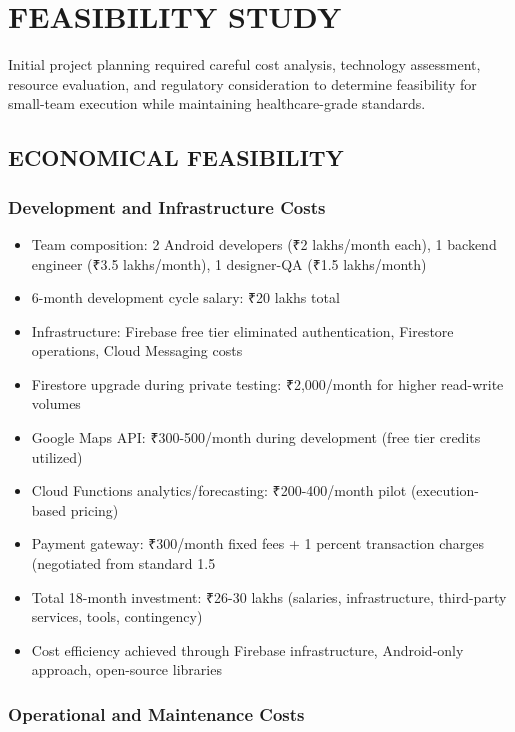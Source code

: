 \documentclass[12pt,a4paper]{report}
\begin{document}
\setcounter{chapter}{1}

\chapter{FEASIBILITY STUDY}

Initial project planning required careful cost analysis, technology assessment, resource evaluation, and regulatory consideration to determine feasibility for small-team execution while maintaining healthcare-grade standards.

\section{ECONOMICAL FEASIBILITY}

\subsection{Development and Infrastructure Costs}

\begin{itemize}
  \item Team composition: 2 Android developers (₹2 lakhs/month each), 1 backend engineer (₹3.5 lakhs/month), 1 designer-QA (₹1.5 lakhs/month)
  \item 6-month development cycle salary: ₹20 lakhs total
  \item Infrastructure: Firebase free tier eliminated authentication, Firestore operations, Cloud Messaging costs
  \item Firestore upgrade during private testing: ₹2,000/month for higher read-write volumes
  \item Google Maps API: ₹300-500/month during development (free tier credits utilized)
  \item Cloud Functions analytics/forecasting: ₹200-400/month pilot (execution-based pricing)
  \item Payment gateway: ₹300/month fixed fees + 1 percent transaction charges (negotiated from standard 1.5%
  \item Total 18-month investment: ₹26-30 lakhs (salaries, infrastructure, third-party services, tools, contingency)
  \item Cost efficiency achieved through Firebase infrastructure, Android-only approach, open-source libraries
\end{itemize}

\subsection{Operational and Maintenance Costs}
\end{document}
